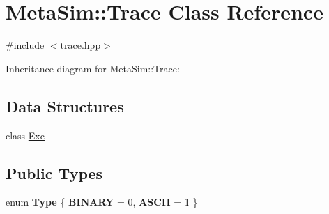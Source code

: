 \hypertarget{classMetaSim_1_1Trace}{}\section{Meta\+Sim\+:\+:Trace Class Reference}
\label{classMetaSim_1_1Trace}


{\ttfamily \#include $<$trace.\+hpp$>$}



Inheritance diagram for Meta\+Sim\+:\+:Trace\+:
\subsection*{Data Structures}
\begin{DoxyCompactItemize}
\item 
class \hyperlink{classMetaSim_1_1Trace_1_1Exc}{Exc}
\end{DoxyCompactItemize}
\subsection*{Public Types}
\begin{DoxyCompactItemize}
\item 
enum {\bfseries Type} \{ {\bfseries B\+I\+N\+A\+RY} = 0, 
{\bfseries A\+S\+C\+II} = 1
 \}\hypertarget{classMetaSim_1_1Trace_a495343b0f3f8812cf88183c1b4e4ec4d}{}\label{classMetaSim_1_1Trace_a495343b0f3f8812cf88183c1b4e4ec4d}

\end{DoxyCompactItemize}
